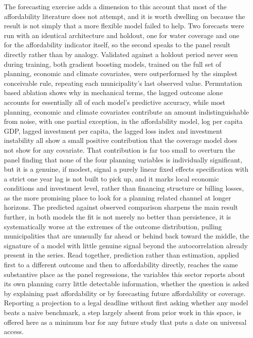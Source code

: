 \documentclass[pdflatex,sn-mathphys-num]{sn-jnl}%
\theoremstyle{thmstyleone}%
\theoremstyle{thmstyletwo}%
\theoremstyle{thmstylethree}%
\begin{document}
The forecasting exercise adds a dimension to this account that most of the affordability literature does not attempt, and it is worth dwelling on because the result is not simply that a more flexible model failed to help. Two forecasts were run with an identical architecture and holdout, one for water coverage and one for the affordability indicator itself, so the second speaks to the panel result directly rather than by analogy. Validated against a holdout period never seen during training, both gradient boosting models, trained on the full set of planning, economic and climate covariates, were outperformed by the simplest conceivable rule, repeating each municipality's last observed value. Permutation based ablation shows why in mechanical terms, the lagged outcome alone accounts for essentially all of each model's predictive accuracy, while most planning, economic and climate covariates contribute an amount indistinguishable from noise, with one partial exception, in the affordability model, log per capita GDP, lagged investment per capita, the lagged loss index and investment instability all show a small positive contribution that the coverage model does not show for any covariate. That contribution is far too small to overturn the panel finding that none of the four planning variables is individually significant, but it is a genuine, if modest, signal a purely linear fixed effects specification with a strict one year lag is not built to pick up, and it marks local economic conditions and investment level, rather than financing structure or billing losses, as the more promising place to look for a planning related channel at longer horizons. The predicted against observed comparison sharpens the main result further, in both models the fit is not merely no better than persistence, it is systematically worse at the extremes of the outcome distribution, pulling municipalities that are unusually far ahead or behind back toward the middle, the signature of a model with little genuine signal beyond the autocorrelation already present in the series. Read together, prediction rather than estimation, applied first to a different outcome and then to affordability directly, reaches the same substantive place as the panel regressions, the variables this sector reports about its own planning carry little detectable information, whether the question is asked by explaining past affordability or by forecasting future affordability or coverage. Reporting a projection to a legal deadline without first asking whether any model beats a naive benchmark, a step largely absent from prior work in this space, is offered here as a minimum bar for any future study that puts a date on universal access.
\end{document}
